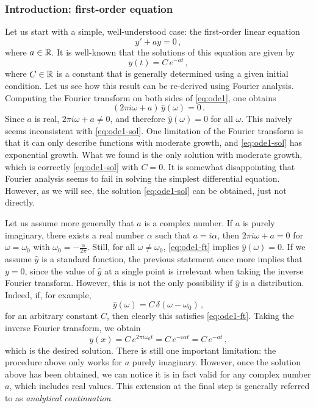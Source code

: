 \subsubsection{Introduction: first-order equation}
Let us start with a simple, well-understood case: the first-order linear equation
\begin{equation}
  y'+ay=0\,,\label{eq:ode1}
\end{equation}
where $a\in\mathbb{R}$. It is well-known that the solutions of this equation are given by
\begin{equation}
  y(t)=C\,e^{-at}\,,
  \label{eq:ode1-sol}
\end{equation}
where $C\in\mathbb{R}$ is a constant that is generally determined using a given initial condition.
Let us see how this result can be re-derived using Fourier analysis. Computing the Fourier
transform on both sides of \cref{eq:ode1}, one obtains
\begin{equation}
  (2\pi i\omega+a)\,\hat{y}(\omega)=0\,.
  \label{eq:ode1-ft}
\end{equation}
Since $a$ is real, $2\pi i\omega+a\neq 0$, and therefore $\hat{y}(\omega)=0$ for all
$\omega$. This naively seems inconsistent with \cref{eq:ode1-sol}. One limitation of the
Fourier transform is that it can only describe functions with moderate growth, and
\cref{eq:ode1-sol} has exponential growth. What we found is the only solution with
moderate growth, which is correctly \cref{eq:ode1-sol} with $C=0$. It is somewhat
disappointing that Fourier analysis seems to fail in solving the simplest differential
equation. However, as we will see, the solution \cref{eq:ode1-sol} can be obtained, just
not directly.

Let us assume more generally that $a$ is a complex number. If $a$ is purely imaginary, \ie
there exists a real number $\alpha$ such that $a=i\alpha$, then $2\pi i\omega+a=0$ for
$\omega=\omega_0$ with $\omega_0=-\frac{\alpha}{2\pi}$. Still, for all
$\omega\neq\omega_0$, \cref{eq:ode1-ft} implies $\hat{y}(\omega)=0$. If we assume
$\hat{y}$ is a standard function, the previous statement once more implies that $y=0$,
since the value of $\hat{y}$ at a single point is irrelevant when taking the inverse
Fourier transform. However, this is not the only possibility if $\hat{y}$ is a
distribution. Indeed, if, for example,
\begin{equation}
  \hat{y}(\omega)=C\,\delta(\omega-\omega_0)\,,
  \label{eq:ode1-delta}
\end{equation}
for an arbitrary constant $C$, then clearly this satisfies \cref{eq:ode1-ft}. Taking the
inverse Fourier transform, we obtain
\begin{equation}
  y(x)=C\,e^{2\pi i\omega_0t}=C\,e^{-i\alpha t}=C\,e^{-at}\,,
\end{equation}
which is the desired solution. There is still one important limitation: the procedure
above only works for $a$ purely imaginary. However, once the solution above has been
obtained, we can notice it is in fact valid for any complex number $a$, which includes real
values. This extension at the final step is generally referred to as \emph{analytical
continuation}.

